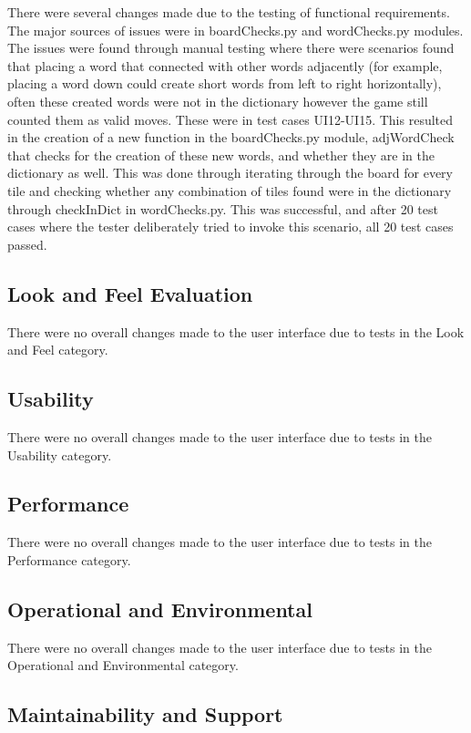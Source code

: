 \documentclass[12pt, titlepage]{article}
\begin{document}
There were several changes made due to the testing of functional requirements. The major sources of issues were in boardChecks.py and wordChecks.py modules. The issues were found through manual testing where there were scenarios found that placing a word that connected with other words adjacently (for example, placing a word down could create short words from left to right horizontally), often these created words were not in the dictionary however the game still counted them as valid moves. These were in test cases UI12-UI15. This resulted in the creation of a new function in the boardChecks.py module, adjWordCheck that checks for the creation of these new words, and whether they are in the dictionary as well. This was done through iterating through the board for every tile and checking whether any combination of tiles found were in the dictionary through checkInDict in wordChecks.py. This was successful, and after 20 test cases where the tester deliberately tried to invoke this scenario, all 20 test cases passed.

\subsection{Look and Feel Evaluation}

There were no overall changes made to the user interface due to tests in the Look and Feel category.

\subsection{Usability}

There were no overall changes made to the user interface due to tests in the Usability category.

\subsection{Performance}

There were no overall changes made to the user interface due to tests in the Performance category.

\subsection{Operational and Environmental}

There were no overall changes made to the user interface due to tests in the Operational and Environmental category.

\subsection{Maintainability and Support}
\end{document}
